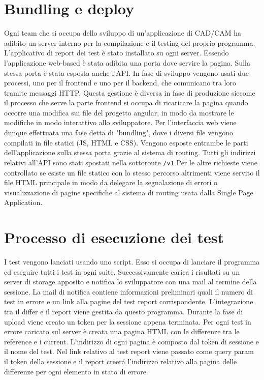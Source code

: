     \section{Bundling e deploy}
        Ogni team che si occupa dello sviluppo di un'applicazione di CAD/CAM ha adibito un server interno per la compilazione e il testing del proprio programma.
        L'applicativo di report dei test è stato installato su ogni server.
        Essendo l'applicazione web-based è stata adibita una porta dove servire la pagina.
        Sulla stessa porta è stata esposta anche l'API.
        In fase di sviluppo vengono usati due processi, uno per il frontend e uno per il backend, che comunicano tra loro tramite messaggi HTTP.
        Questa gestione è diversa in fase di produzione siccome il processo che serve la parte frontend si occupa di ricaricare la pagina quando occorre una modifica sui file del progetto angular, in modo da mostrare le modifiche in modo interattivo allo sviluppatore.
        Per l'interfaccia web viene dunque effettuata una fase detta di "bundling", dove i diversi file  vengono compilati in file statici (JS, HTML e CSS).
        Vengono esposte entrambe le parti dell'applicazione sulla stessa porta grazie al sistema di routing.
        Tutti gli indirizzi relativi all'API sono stati spostati nella sottoroute \verb|/v1|
        Per le altre richieste viene controllato se esiste un file statico con lo stesso percorso altrimenti viene servito il file HTML principale in modo da delegare la segnalazione di errori o visualizzazione di pagine specifiche al sistema di routing usata dalla Single Page Application.

    \section{Processo di esecuzione dei test\label{testexecution}}
        I test vengono lanciati usando uno script.
        Esso si occupa di lanciare il programma ed eseguire tutti i test in ogni suite.
        Successivamente carica i risultati su un server di storage apposito e notifica lo sviluppatore con una mail al termine della sessione.
        La mail di notifica contiene informazioni preliminari quali il numero di test in errore e un link alla pagine del test report corrispondente.
        L'integrazione tra il differ e il report viene gestita da questo programma.
        Durante la fase di upload viene creato un token per la sessione appena terminata.
        Per ogni test in errore caricato sul server è creata una pagina HTML con le differenze tra le reference e i current.
        L'indirizzo di ogni pagina è composto dal token di sessione e il nome del test.
        Nel link relativo al test report viene passato come query param il token della sessione e il report creer\'a l'indirizzo relativo alla pagina delle differenze per ogni elemento in stato di errore.
